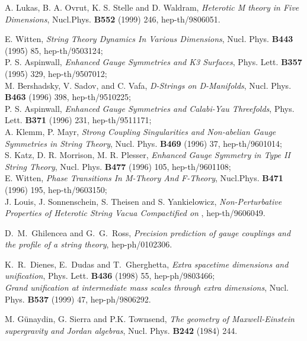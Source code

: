 \documentclass[a4paper,11pt]{article}
\begin{document}
\begin{thebibliography}{99}
  A. Lukas, B. A. Ovrut, K. S. Stelle and D. Waldram,
\emph{Heterotic M theory in Five Dimensions}, Nucl.Phys. \textbf{B552}
(1999)
246, hep-th/9806051.

E. Witten, \emph{String Theory Dynamics In Various Dimensions}, 
Nucl. Phys. \textbf{B443} (1995) 85, hep-th/9503124;\\
P. S. Aspinwall, \emph{Enhanced Gauge Symmetries and K3 Surfaces}, 
 Phys. Lett. \textbf{B357} (1995) 329, hep-th/9507012;\\
M. Bershadsky, V. Sadov, and  C. Vafa, \emph{D-Strings on D-Manifolds},
Nucl. Phys. \textbf{B463} (1996) 398, hep-th/9510225;\\
 P. S. Aspinwall, \emph{Enhanced Gauge 
Symmetries and Calabi-Yau Threefolds},  Phys. Lett. \textbf{B371}
 (1996) 231, hep-th/9511171;\\
 A. Klemm, P. Mayr, \emph{Strong Coupling Singularities and Non-abelian Gauge
Symmetries in \coordHE{} String Theory}, Nucl. Phys. \textbf{B469} (1996)
37, hep-th/9601014;\\
S. Katz, D. R. Morrison, M. R. Plesser, \emph{Enhanced 
Gauge Symmetry in Type II String Theory},  Nucl. Phys. \textbf{B477}
 (1996) 105, hep-th/9601108;\\
E. Witten, \emph{Phase Transitions In M-Theory And F-Theory},
Nucl.Phys. \textbf{B471} (1996) 195, hep-th/9603150;\\
J. Louis, J. Sonnenschein, S. Theisen and S. Yankielowicz,
\emph{Non-Perturbative Properties of Heterotic String Vacua Compactified on
\coordHE{}}, hep-th/9606049. 



D.~M.~Ghilencea and G.~G.~Ross,
\emph{Precision prediction of gauge couplings and the profile of a string
theory},
hep-ph/0102306.

K.~R.~Dienes, E.~Dudas and T.~Gherghetta,
\emph{Extra spacetime dimensions and unification},
Phys. Lett. {\bf B436} (1998) 55, hep-ph/9803466;\\
\emph{Grand unification at intermediate mass scales through extra
dimensions},
Nucl. Phys. {\bf B537} (1999) 47, hep-ph/9806292.

 M. G\"{u}naydin, G. Sierra and  P.K. Townsend,
\emph{The geometry of \coordHE{} Maxwell-Einstein supergravity and Jordan algebras},
Nucl. Phys. \textbf{B242} (1984) 244.


\end{thebibliography}
\end{document}

